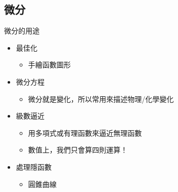 \documentclass{beamer}
\begin{document}
\begin{CJK}{UTF8}{bsmi}
\section{微分}
\begin{frame}{微分的用途}
  \begin{itemize}
    \item 最佳化
      \begin{itemize}
	\item 手繪函數圖形
      \end{itemize}
    \item 微分方程
      \begin{itemize}
	\item 微分就是變化，所以常用來描述物理/化學變化
      \end{itemize}
    \item 級數逼近
      \begin{itemize}
	\item 用多項式或有理函數來逼近無理函數
	\item 數值上，我們只會算四則運算！
      \end{itemize}
    \item 處理隱函數
      \begin{itemize}
	\item 圓錐曲線
      \end{itemize}
  \end{itemize}
\end{frame}


\end{CJK}
\end{document}
